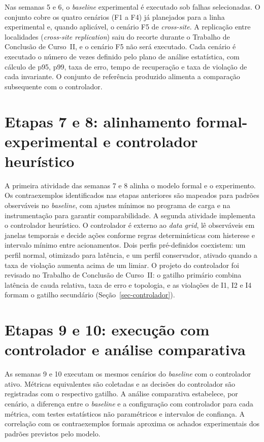 Nas semanas 5 e 6, o \emph{baseline} experimental é executado sob falhas selecionadas. O conjunto cobre os quatro cenários (F1 a F4) já planejados para a linha experimental e, quando aplicável, o cenário F5 de \emph{cross-site}. A replicação entre localidades (\emph{cross-site replication}) saiu do recorte durante o Trabalho de Conclusão de Curso~II, e o cenário F5 não será executado. Cada cenário é executado o número de vezes definido pelo plano de análise estatística, com cálculo de p95, p99, taxa de erro, tempo de recuperação e taxa de violação de cada invariante. O conjunto de referência produzido alimenta a comparação subsequente com o controlador.

\section*{Etapas 7 e 8: alinhamento formal-experimental e controlador heurístico}
\label{ap-tcc2-etapa7}

A primeira atividade das semanas 7 e 8 alinha o modelo formal e o experimento. Os contraexemplos identificados nas etapas anteriores são mapeados para padrões observáveis no \emph{baseline}, com ajustes mínimos no programa de carga e na instrumentação para garantir comparabilidade. A segunda atividade implementa o controlador heurístico. O controlador é externo ao \emph{data grid}, lê observáveis em janelas temporais e decide ações conforme regras determinísticas com histerese e intervalo mínimo entre acionamentos. Dois perfis pré-definidos coexistem: um perfil normal, otimizado para latência, e um perfil conservador, ativado quando a taxa de violação aumenta acima de um limiar. O projeto do controlador foi revisado no Trabalho de Conclusão de Curso~II: o gatilho primário combina latência de cauda relativa, taxa de erro e topologia, e as violações de I1, I2 e I4 formam o gatilho secundário (Seção~\ref{sec-controlador}).

\section*{Etapas 9 e 10: execução com controlador e análise comparativa}
\label{ap-tcc2-etapa9}

As semanas 9 e 10 executam os mesmos cenários do \emph{baseline} com o controlador ativo. Métricas equivalentes são coletadas e as decisões do controlador são registradas com o respectivo gatilho. A análise comparativa estabelece, por cenário, a diferença entre o \emph{baseline} e a configuração com controlador para cada métrica, com testes estatísticos não paramétricos e intervalos de confiança. A correlação com os contraexemplos formais aproxima os achados experimentais dos padrões previstos pelo modelo.


